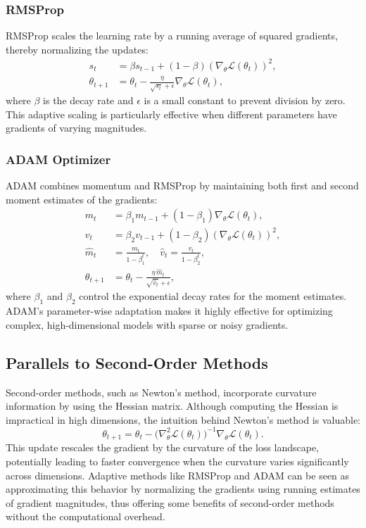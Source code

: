 \subsubsection{RMSProp}
RMSProp scales the learning rate by a running average of squared gradients, thereby normalizing the updates:
\begin{align}
s_t &= \beta s_{t-1} + (1-\beta) \left(\nabla_\theta \mathcal{L}(\theta_t)\right)^2, \\
\theta_{t+1} &= \theta_t - \frac{\eta}{\sqrt{s_t} + \epsilon} \nabla_\theta \mathcal{L}(\theta_t),
\label{eq:rmsprop_update}
\end{align}
where \(\beta\) is the decay rate and \(\epsilon\) is a small constant to prevent division by zero. This adaptive scaling is particularly effective when different parameters have gradients of varying magnitudes.

\subsubsection{ADAM Optimizer}
ADAM combines momentum and RMSProp by maintaining both first and second moment estimates of the gradients:
\begin{align}
m_t &= \beta_1 m_{t-1} + (1-\beta_1) \nabla_\theta \mathcal{L}(\theta_t), \\
v_t &= \beta_2 v_{t-1} + (1-\beta_2) \left(\nabla_\theta \mathcal{L}(\theta_t)\right)^2, \\
\hat{m}_t &= \frac{m_t}{1-\beta_1^t}, \quad \hat{v}_t = \frac{v_t}{1-\beta_2^t}, \\
\theta_{t+1} &= \theta_t - \frac{\eta \, \hat{m}_t}{\sqrt{\hat{v}_t} + \epsilon},
\label{eq:adam_update}
\end{align}
where \(\beta_1\) and \(\beta_2\) control the exponential decay rates for the moment estimates. ADAM's parameter-wise adaptation makes it highly effective for optimizing complex, high-dimensional models with sparse or noisy gradients.

\subsection{Parallels to Second-Order Methods}
Second-order methods, such as Newton's method, incorporate curvature information by using the Hessian matrix. Although computing the Hessian is impractical in high dimensions, the intuition behind Newton’s method is valuable:
\begin{equation}
\theta_{t+1} = \theta_t - \bigl(\nabla^2_\theta \mathcal{L}(\theta_t)\bigr)^{-1} \nabla_\theta \mathcal{L}(\theta_t).
\label{eq:newton_update}
\end{equation}
This update rescales the gradient by the curvature of the loss landscape, potentially leading to faster convergence when the curvature varies significantly across dimensions. Adaptive methods like RMSProp and ADAM can be seen as approximating this behavior by normalizing the gradients using running estimates of gradient magnitudes, thus offering some benefits of second-order methods without the computational overhead.

